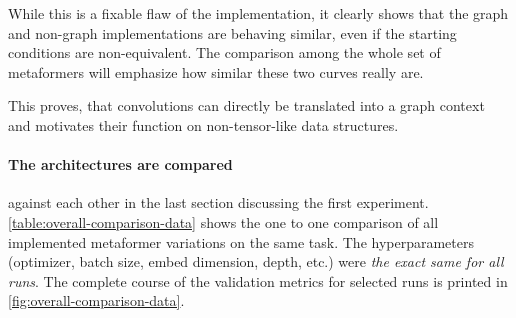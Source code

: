 While this is a fixable flaw of the implementation, it clearly shows that the graph and non-graph implementations are behaving similar, even if the starting conditions are non-equivalent.
The comparison among the whole set of metaformers will emphasize how similar these two curves really are.

This proves, that convolutions can directly be translated into a graph context and motivates their function on non-tensor-like data structures.

\FloatBarrier
\paragraph{The architectures are compared} against each other in the last section discussing the first experiment. 
\autoref{table:overall-comparison-data} shows the one to one comparison of all implemented metaformer variations on the same task.
The hyperparameters (optimizer, batch size, embed dimension, depth, etc.) were \emph{the exact same for all runs}. 
The complete course of the validation metrics for selected runs is printed in \autoref{fig:overall-comparison-data}.


